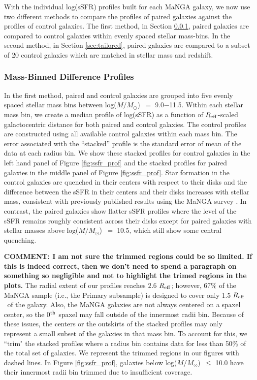 \documentclass[iop,revtex4,twocolumn,apj,numberedappendix,appendixfloats]{emulateapj}
\newcommand{\reff}{$R_{\rm eff}$}
\newcommand{\logm}{log($M/M_{\odot}$)}
\begin{document}
With the individual log(sSFR) profiles built for each MaNGA galaxy, we now use two different methods to compare the profiles of paired galaxies against the profiles of control galaxies. The first method, in Section \ref{sec:mass-bin}, paired galaxies are compared to control galaxies within evenly spaced stellar mass-bins. In the second method, in Section \ref{sec:tailored}, paired galaxies are compared to a subset of 20 control galaxies which are matched in stellar mass and redshift. 

\subsubsection{Mass-Binned Difference Profiles}\label{sec:mass-bin}

In the first method, paired and control galaxies are grouped into five evenly spaced stellar mass bins between \logm\ $=$ 9.0$-$11.5. Within each stellar mass bin, we create a median profile of log(sSFR) as a function of \reff-scaled galactocentric distance for both paired and control galaxies. The control profiles are constructed using all available control galaxies within each mass bin. The error associated with the ``stacked'' profile is the standard error of mean of the data at each radius bin. We show these stacked profiles for control galaxies in the left hand panel of Figure \ref{fig:ssfr_prof} and the stacked profiles for paired galaxies in the middle panel of Figure \ref{fig:ssfr_prof}. Star formation in the control galaxies are quenched in their centers with respect to their disks and the difference between the sSFR in their centers and their disks increases with stellar mass, consistent with previously published results using the MaNGA survey \citep{Belfiore:2018}. In contrast, the paired galaxies show flatter sSFR profiles where the level of the sSFR remains roughly consistent across their disks except for paired galaxies with stellar masses above \logm\ $=$ 10.5, which still show some central quenching. 

{\bf COMMENT: I am not sure the trimmed regions could be so limited. If this is indeed correct, then we don't need to spend a paragraph on something so negligible and not to highlight the trimed regions in the plots.} 
The radial extent of our profiles reaches 2.6 \reff; however, 67\% of the MaNGA sample (i.e., the Primary subsample) is designed to cover only 1.5 \reff\ of the galaxy. Also, the MaNGA galaxies are not always centered on a spaxel center, so the 0$^{\rm th}$ spaxel may fall outside of the innermost radii bin. Because of these issues, the centers or the outskirts of the stacked profiles may only represent a small subset of the galaxies in that mass bin. To account for this, we ``trim" the stacked profiles where a radius bin contains data for less than 50\% of the total set of galaxies. We represent the trimmed regions in our figures with dashed lines. In Figure \ref{fig:ssfr_prof}, galaxies below \logm\ $\le$ 10.0 have their innermost radii bin trimmed due to insufficient coverage.
\end{document}
